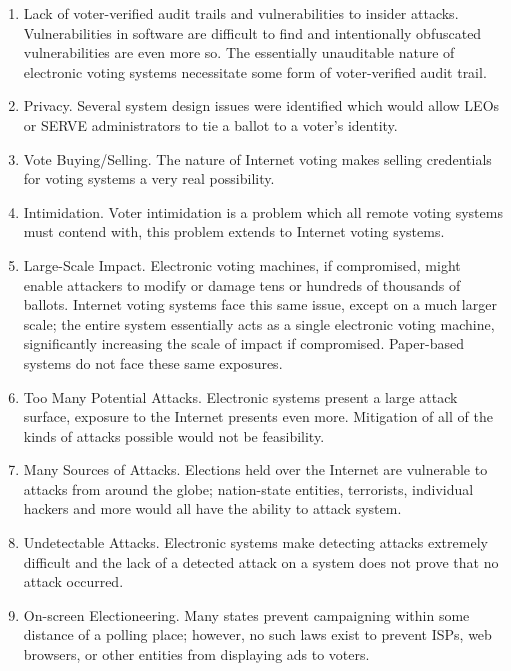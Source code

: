 \begin{enumerate}
  \item Lack of voter-verified audit trails and vulnerabilities to insider
    attacks. Vulnerabilities in software are difficult to find and intentionally
    obfuscated vulnerabilities are even more so. The essentially unauditable
    nature of electronic voting systems necessitate some form of voter-verified
    audit trail.

  \item Privacy. Several system design issues were identified which would allow
    LEOs or SERVE administrators to tie a ballot to a voter's identity.

  \item Vote Buying/Selling. The nature of Internet voting makes selling
    credentials for voting systems a very real possibility.

  \item Intimidation. Voter intimidation is a problem which all remote voting
    systems must contend with, this problem extends to Internet voting systems.

  \item Large-Scale Impact. Electronic voting machines, if compromised, might
    enable attackers to modify or damage tens or hundreds of thousands of
    ballots. Internet voting systems face this same issue, except on a much
    larger scale; the entire system essentially acts as a single electronic
    voting machine, significantly increasing the scale of impact if compromised.
    Paper-based systems do not face these same exposures.

  \item Too Many Potential Attacks. Electronic systems present a large attack
    surface, exposure to the Internet presents even more. Mitigation of all of
    the kinds of attacks possible would not be feasibility.

  \item Many Sources of Attacks. Elections held over the Internet are vulnerable
    to attacks from around the globe; nation-state entities, terrorists,
    individual hackers and more would all have the ability to attack system.

  \item Undetectable Attacks. Electronic systems make detecting attacks
    extremely difficult and the lack of a detected attack on a system does not
    prove that no attack occurred.

  \item On-screen Electioneering. Many states prevent campaigning within some
    distance of a polling place; however, no such laws exist to prevent ISPs,
    web browsers, or other entities from displaying ads to voters.
\end{enumerate}

